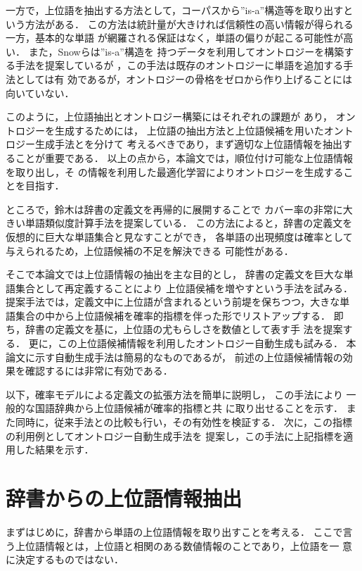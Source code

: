 \documentclass[japanese]{jnlp_1.4}
\begin{document}
一方で，上位語を抽出する方法として，コーパスから''is-a''構造等を取り出すと
いう方法がある． 
この方法は統計量が大きければ信頼性の高い情報が得られる一方，基本的な単語
が網羅される保証はなく，単語の偏りが起こる可能性が高い． 
また，Snowらは''is-a''構造を
持つデータを利用してオントロジーを構築する手法を提案しているが
\cite{Snow06}，この手法は既存のオントロジーに単語を追加する手法としては有
効であるが，オントロジーの骨格をゼロから作り上げることには向いていない． 

このように，上位語抽出とオントロジー構築にはそれぞれの課題が
あり，
オントロジーを生成するためには，
上位語の抽出方法と上位語候補を用いたオントロジー生成手法とを分けて
考えるべきであり，まず適切な上位語情報を抽出することが重要である．
以上の点から，本論文では，順位付け可能な上位語情報を取り出し，そ
の情報を利用した最適化学習によりオントロジーを生成することを目指す．


ところで，鈴木は辞書の定義文を再帰的に展開することで
カバー率の非常に大きい単語類似度計算手法を提案している\cite{Suzuki2,Suzuki3j}．
この方法によると，辞書の定義文を仮想的に巨大な単語集合と見なすことができ，
各単語の出現頻度は確率として与えられるため，上位語候補の不足を解決できる
可能性がある．

そこで本論文では上位語情報の抽出を主な目的とし，
辞書の定義文を巨大な単語集合として再定義することにより
上位語侯補を増やすという手法を試みる．
提案手法では，定義文中に上位語が含まれるという前堤を保ちつつ，大きな単
語集合の中から上位語候補を確率的指標を伴った形でリストアップする．
即ち，辞書の定義文を基に，上位語の尤もらしさを数値として表す手
法を提案する． 
更に，この上位語候補情報を利用したオントロジー自動生成も試みる．
本論文に示す自動生成手法は簡易的なものであるが，
前述の上位語候補情報の効果を確認するには非常に有効である．

以下，確率モデルによる定義文の拡張方法を簡単に説明し，
この手法により
一般的な国語辞典から上位語候補が確率的指標と共
に取り出せることを示す． 
また同時に，従来手法との比較も行い，その有効性を検証する．
次に，この指標の利用例としてオントロジー自動生成手法を
提案し，この手法に上記指標を適用した結果を示す．


\section{辞書からの上位語情報抽出}
\label{sec:hyperinfo}

まずはじめに，辞書から単語の上位語情報を取り出すことを考える．
ここで言う上位語情報とは，上位語と相関のある数値情報のことであり，上位語を一
意に決定するものではない．
\end{document}
